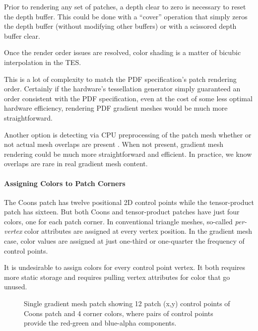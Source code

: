 Prior to rendering any set of patches, a depth clear to zero is necessary to reset the depth buffer.  This could
be done with a ``cover'' operation that simply zeros the depth buffer (without modifying other buffers) or with
a scissored depth buffer clear.

Once the render order issues are resolved, color shading is a matter of bicubic interpolation \cite{Sun:2007:IVU:1276377.1276391} in the TES.

This is a lot of complexity to match the PDF specification's patch rendering order.  Certainly if the hardware's
tessellation generator simply guaranteed an order consistent with the PDF specification, even at the cost of some
less optimal hardware efficiency, rendering PDF gradient meshes would be much more straightforward.

Another option is detecting via CPU preprocessing of the patch mesh whether or not actual mesh overlaps are present \cite{Randrianarivony04necessaryand}.
When not present, gradient mesh rendering could be much more straightforward and efficient.  In practice,
we know overlaps are rare in real gradient mesh content.

\ifdefined\NOSHOW

\paragraph{Assigning Colors to Patch Corners}

The Coons patch has twelve positional 2D control points while the tensor-product patch has sixteen.
But both Coons and tensor-product patches have just four colors, one for each patch corner.
In conventional triangle meshes, so-called {\em per-vertex} color attributes are assigned at every vertex position.
In the gradient mesh case, color values are assigned at just one-third or one-quarter the frequency of control points.

It is undesirable to assign colors for every control point vertex.  It both requires more static storage and
requires pulling vertex attributes for color that go unused.

\begin{figure}[tb]
  \caption{\label{fig:gradient-mesh}
Single gradient mesh patch showing 12 patch (x,y) control points of Coons patch
and 4 corner colors, where pairs of
control points provide the red-green and blue-alpha components.}
\end{figure}

